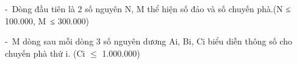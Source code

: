 - Dòng đầu tiên là 2 số nguyên N, M thể hiện số đảo và số chuyến phà.(N ≤ 100.000, M ≤ 300.000)  

   - M dòng sau mỗi dòng 3 số nguyên dương Ai, Bi, Ci biểu diễn thông số cho chuyến phà thứ i. (Ci  $\le$  1.000.000)  

\